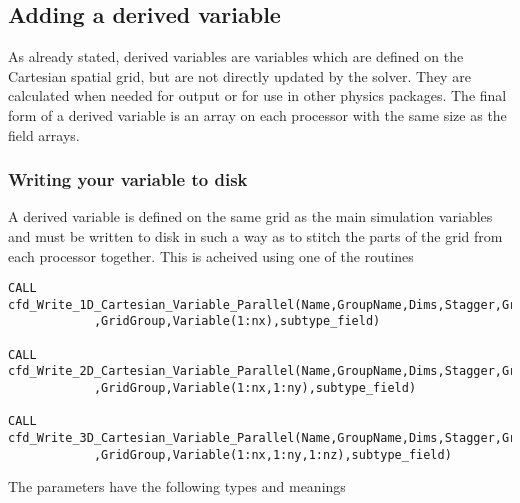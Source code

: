 \documentclass[12pt]{article}
\newcommand{\simpleboxverbatim}{\begin{Verbatim}[obeytabs=true,frame=single,
  framerule=0.5mm,rulecolor=\color{warwickmid}]}
\begin{document}
\subsection{Adding a derived variable}

As already stated, derived variables are variables which are defined on the
Cartesian spatial grid, but are not directly updated by the solver. They are
calculated when needed for output or for use in other physics packages. The
final form of a derived variable is an array on each processor with the same
size as the field arrays.

\subsubsection{Writing your variable to disk}
A derived variable is defined on the same grid as the main simulation variables
and must be written to disk in such a way as to stitch the parts of the grid
from each processor together. This is acheived using one of the routines
\simpleboxverbatim
CALL cfd_Write_1D_Cartesian_Variable_Parallel(Name,GroupName,Dims,Stagger,GridName&
            ,GridGroup,Variable(1:nx),subtype_field)

CALL cfd_Write_2D_Cartesian_Variable_Parallel(Name,GroupName,Dims,Stagger,GridName&
            ,GridGroup,Variable(1:nx,1:ny),subtype_field)

CALL cfd_Write_3D_Cartesian_Variable_Parallel(Name,GroupName,Dims,Stagger,GridName&
            ,GridGroup,Variable(1:nx,1:ny,1:nz),subtype_field)
\end{Verbatim}
The parameters have the following types and meanings
\end{document}
